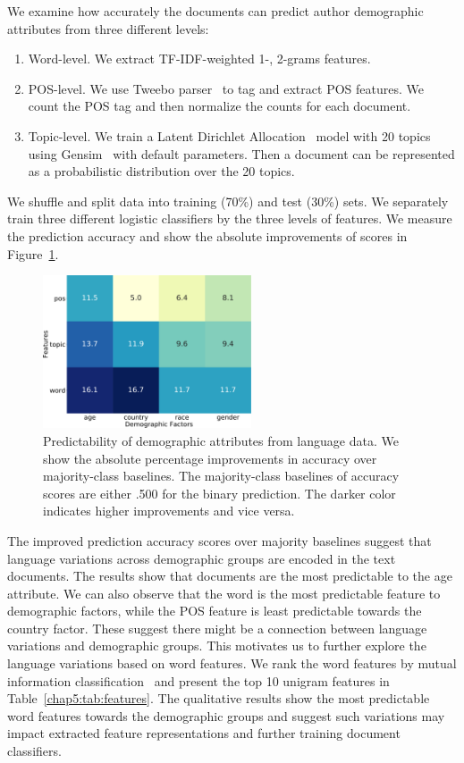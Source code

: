 We examine how accurately the documents can predict author demographic attributes from three different levels:
\begin{enumerate}
    \item Word-level. We extract TF-IDF-weighted 1-, 2-grams features.
    \item POS-level. We use Tweebo parser~\cite{kong2014dependency} to tag and extract POS features. We count the POS tag and then normalize the counts for each document.
    \item Topic-level. We train a Latent Dirichlet Allocation~\cite{blei2003latent} model with 20 topics using Gensim~\cite{rehurek2010software} with default parameters. Then a document can be represented as a probabilistic distribution over the 20 topics.
\end{enumerate}

We shuffle and split data into training (70\%) and test (30\%) sets.
We separately train three different logistic classifiers by the three levels of features.
We measure the prediction accuracy and show the absolute improvements of scores in Figure~\ref{chap5:fig:predictability}.

\begin{figure}[htp]
\centering
\includegraphics[width=0.55\textwidth]{images/chapter5/predictability.pdf}
\caption{Predictability of demographic attributes from language
data. We show the absolute percentage improvements in accuracy over majority-class baselines. The majority-class baselines of accuracy scores are either .500 for the binary prediction. The darker color indicates higher improvements and vice versa.}
\label{chap5:fig:predictability}
\end{figure}

The improved prediction accuracy scores over majority baselines suggest that language variations across demographic groups are encoded in the text documents. 
The results show that documents are the most predictable to the age attribute.
We can also observe that the word is the most predictable feature to demographic factors,
while the POS feature is least predictable towards the country factor.
These suggest there might be a connection between language variations and demographic groups.
This motivates us to further explore the language variations based on word features.
We rank the word features by mutual information classification~\cite{pedregosa2011scikit} and present the top 10 unigram features in Table~\ref{chap5:tab:features}.
The qualitative results show the most predictable word features towards the demographic groups and 
suggest such variations may impact extracted feature representations and further training document classifiers.


